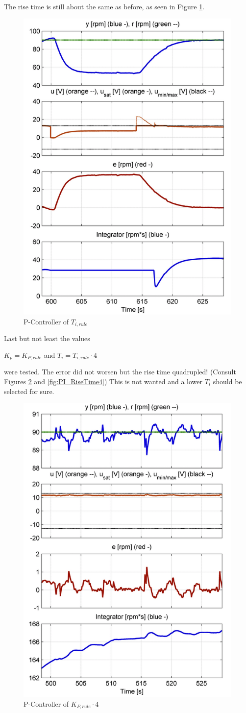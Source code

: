 The rise time is still about the same as before, as seen in Figure \ref{fig:PI_RiseTime1}.

\begin{figure}[H]
\begin{center}
\includegraphics[width=0.5\linewidth]{images/general/PI/PI_RiseTime1}
\end{center}
\caption{P-Controller of $ T_{i,rule}$}
\label{fig:PI_RiseTime1}
\end{figure}

Last but not least the values

\begin{center}
{$K_{p}= K_{P,rule}$ and $T_{i}=T_{i,rule}\cdot4$}
\end{center}

were tested. The error did not worsen but the rise time quadrupled!
(Consult Figures \ref{fig:PI_Controller4} and \ref{fig:PI_RiseTime4})
This is not wanted and a lower $T_i$ should be selected for sure.

\begin{figure}[H]
\begin{center}
\includegraphics[width=0.5\linewidth]{images/general/PI/PI_Controller4}
\end{center}
\caption{P-Controller of $ K_{P,rule}\cdot4$}
\label{fig:PI_Controller4}
\end{figure}

